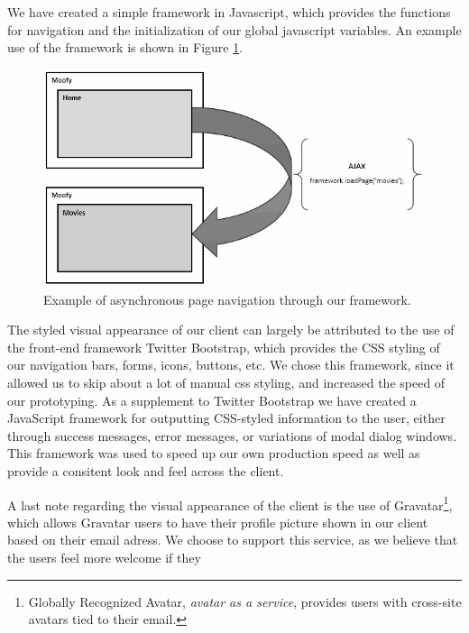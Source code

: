 We have created a simple framework in Javascript, which provides the functions for navigation and the initialization of our global javascript variables. An example use of the framework is shown in Figure \ref{fig:ajax}.

\begin{figure}[hbt]
	\centering
	\centerline{\includegraphics[scale=0.7]{./p1design/ajax.png}}
	\caption{Example of asynchronous page navigation through our framework.}
	\label{fig:ajax}
\end{figure}

The styled visual appearance of our client can largely be attributed to the use of the front-end framework Twitter Bootstrap, which provides the CSS styling of our navigation bars, forms, icons, buttons, etc. We chose this framework, since it allowed us to skip about a lot of manual css styling, and increased the speed of our prototyping. As a supplement to Twitter Bootstrap we have created a JavaScript framework for outputting CSS-styled information to the user, either through success messages, error messages, or variations of modal dialog windows. This framework was used to speed up our own production speed as well as provide a consitent look and feel across the client.

A last note regarding the visual appearance of the client is the use of Gravatar\footnote{Globally Recognized Avatar, \emph{avatar as a service}, provides users with cross-site avatars tied to their email.}, which allows Gravatar users to have their profile picture shown in our client based on their email adress. We choose to support this service, as we believe that the users feel more welcome if they